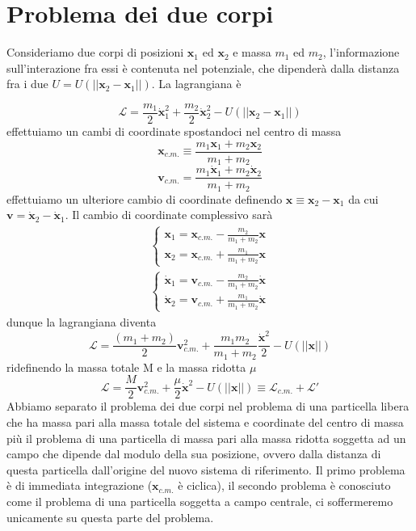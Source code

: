 \documentclass[
10pt, %
a4paper, %
oneside, %
headinclude,footinclude, %
BCOR5mm, %
]{scrartcl}
\begin{document}
\newpage
\section{Problema dei due corpi}
Consideriamo due corpi di posizioni \(\mathbf{x}_1\) ed \(\mathbf{x}_2\) e massa \(m_1\) ed \(m_2\), l'informazione sull'interazione fra essi è contenuta nel potenziale, che dipenderà dalla distanza fra i due \(U =U(||\mathbf{x}_2 - \mathbf{x}_1||)\). La lagrangiana è

\[\mathcal{L} = \frac{m_1}{2}\dot{\mathbf{x}}_1^2+\frac{m_2}{2}\dot{\mathbf{x}}_2^2-U(||\mathbf{x}_2-\mathbf{x}_1||)\]
effettuiamo un cambi di coordinate spostandoci nel centro di massa
\[\mathbf{x}_{c.m.} \equiv \frac{m_1\mathbf{x}_1+m_2\mathbf{x}_2}{m_1+m_2}\]
\[\mathbf{v}_{c.m.} = \frac{m_1\dot{\mathbf{x}}_1+m_2\dot{\mathbf{x}}_2}{m_1+m_2}\]
effettuiamo un ulteriore cambio di coordinate definendo \(\mathbf{x}\equiv \mathbf{x}_2-\mathbf{x}_1\) da cui \(\mathbf{v} = \dot{\mathbf{x}}_2-\dot{\mathbf{x}}_1\). Il cambio di coordinate complessivo sarà
\begin{align*}
	\begin{cases}
		\mathbf{x}_1 = \mathbf{x}_{c.m.}-\frac{m_2}{m_1+m_2}\mathbf{x}\\
		\mathbf{x}_2 = \mathbf{x}_{c.m.}+\frac{m_1}{m_1+m_2}\mathbf{x}
	\end{cases}\\
	\begin{cases}
		\dot{\mathbf{x}}_1 =\mathbf{v}_{c.m.}-\frac{m_2}{m_1+m_2}\dot{\mathbf{x}} \\
		\dot{\mathbf{x}}_2 =\mathbf{v}_{c.m.}+\frac{m_1}{m_1+m_2}\dot{\mathbf{x}} 
	\end{cases}
\end{align*}
dunque la lagrangiana diventa
\[\mathcal{L} = \frac{(m_1 + m_2)}{2}\mathbf{v}_{c.m.}^2+\frac{m_1m_2}{m_1 + m_2}\frac{\dot{\mathbf{x}}^2}{2}-U(||\mathbf{x}||)\]
ridefinendo la massa totale M e la massa ridotta \(\mu\)
\[\mathcal{L} = \frac{M}{2}\mathbf{v}_{c.m.}^2+\frac{\mu}{2}\dot{\mathbf{x}}^2-U(||\mathbf{x}||) \equiv \mathcal{L}_{c.m.}+\mathcal{L}'\]
Abbiamo separato il problema dei due corpi nel problema di una particella libera che ha massa pari alla massa totale del sistema e coordinate del centro di massa più il problema di una particella di massa pari alla massa ridotta soggetta ad un campo che dipende dal modulo della sua posizione, ovvero dalla distanza di questa particella dall'origine del nuovo sistema di riferimento. Il primo problema è di immediata integrazione (\(\mathbf{x}_{c.m.}\) è ciclica), il secondo problema è conosciuto come il problema di una particella soggetta a campo centrale, ci soffermeremo unicamente su questa parte del problema.
\end{document}
